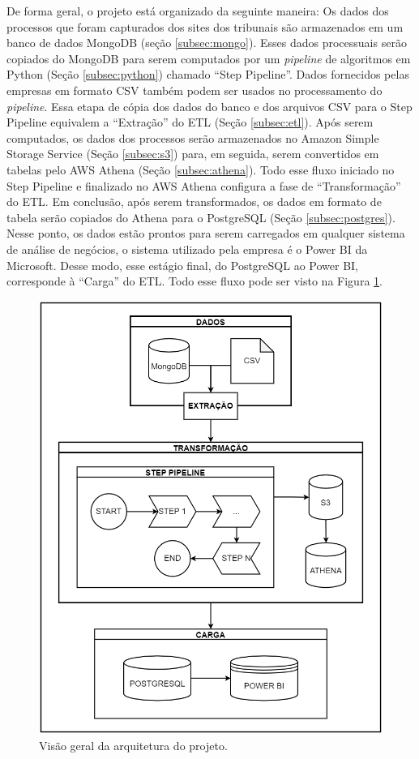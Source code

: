 De forma geral, o projeto está organizado da seguinte maneira: Os dados dos processos que foram capturados dos sites dos tribunais são armazenados em um banco de dados MongoDB (seção \ref{subsec:mongo}). Esses dados processuais serão copiados do MongoDB para serem computados por um \textit{pipeline} de algoritmos em Python (Seção \ref{subsec:python}) chamado \enquote{Step Pipeline}. Dados fornecidos pelas empresas em formato CSV também podem ser usados no processamento do \textit{pipeline}. Essa etapa de cópia dos dados do banco e dos arquivos CSV para o Step Pipeline equivalem a “Extração” do ETL (Seção \ref{subsec:etl}). Após serem computados, os dados dos processos serão armazenados no Amazon Simple Storage Service (Seção \ref{subsec:s3}) para, em seguida, serem convertidos em tabelas pelo AWS Athena (Seção \ref{subsec:athena}). Todo esse fluxo iniciado no Step Pipeline e finalizado no AWS Athena configura a fase de \enquote{Transformação} do ETL. Em conclusão, após serem transformados, os dados em formato de tabela serão copiados do Athena para o PostgreSQL (Seção \ref{subsec:postgres}). Nesse ponto, os dados estão prontos para serem carregados em qualquer sistema de análise de negócios, o sistema utilizado pela empresa é o Power BI da Microsoft. Desse modo, esse estágio final, do PostgreSQL ao Power BI, corresponde à \enquote{Carga} do ETL. Todo esse fluxo pode ser visto na Figura \ref{fig:arquiteturaGeral}.

\begin{figure}[ht]
\centering
\includegraphics[width=.6\textwidth]{imagens/arquitetura_geral.png}
\caption{Visão geral da arquitetura do projeto.}
\label{fig:arquiteturaGeral}
\end{figure}

